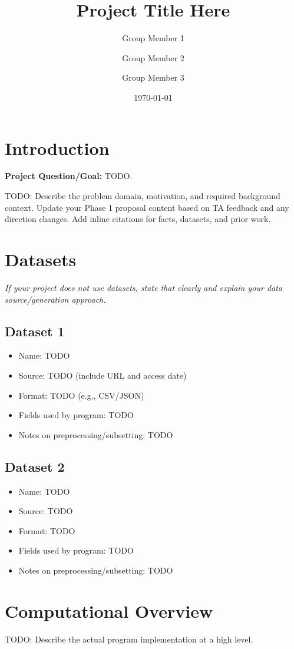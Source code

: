 \documentclass[12pt]{article}
\title{Project Title Here}
\author{Group Member 1 \and Group Member 2 \and Group Member 3}
\date{\today}
\begin{document}
\maketitle
\onehalfspacing

\section{Introduction}
\textbf{Project Question/Goal:} TODO.

TODO: Describe the problem domain, motivation, and required background context.
Update your Phase 1 proposal content based on TA feedback and any direction changes.
Add inline citations for facts, datasets, and prior work.

\section{Datasets}
\textit{If your project does not use datasets, state that clearly and explain your data source/generation approach.}

\subsection{Dataset 1}
\begin{itemize}[leftmargin=*]
    \item Name: TODO
    \item Source: TODO (include URL and access date)
    \item Format: TODO (e.g., CSV/JSON)
    \item Fields used by program: TODO
    \item Notes on preprocessing/subsetting: TODO
\end{itemize}

\subsection{Dataset 2}
\begin{itemize}[leftmargin=*]
    \item Name: TODO
    \item Source: TODO
    \item Format: TODO
    \item Fields used by program: TODO
    \item Notes on preprocessing/subsetting: TODO
\end{itemize}

\section{Computational Overview}
TODO: Describe the actual program implementation at a high level.
\end{document}
